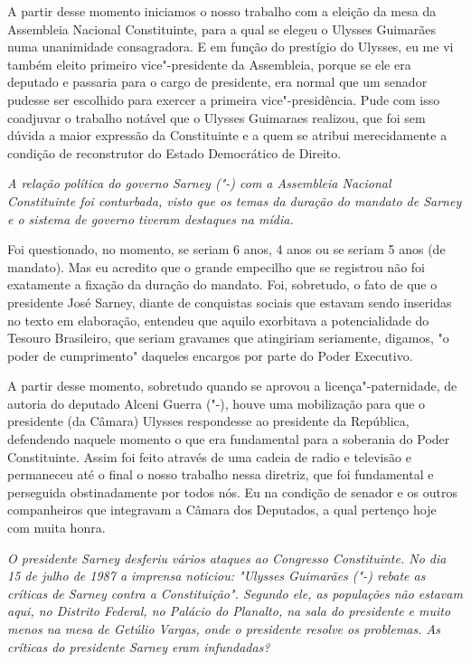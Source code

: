 A partir desse momento iniciamos o nosso trabalho com a eleição da mesa
da Assembleia Nacional Constituinte, para a qual se elegeu o Ulysses
Guimarães numa unanimidade consagradora. E em função do prestígio do
Ulysses, eu me vi também eleito primeiro vice"-presidente da Assembleia,
porque se ele era deputado e passaria para o cargo de presidente, era
normal que um senador pudesse ser escolhido para exercer a primeira
vice"-presidência. Pude com isso coadjuvar o trabalho notável que o
Ulysses Guimaraes realizou, que foi sem dúvida a maior expressão da
Constituinte e a quem se atribui merecidamente a condição de
reconstrutor do Estado Democrático de Direito.

\medskip

\emph{A relação política do governo Sarney ("-) com a Assembleia
Nacional Constituinte foi conturbada, visto que os temas da duração do
mandato de Sarney e o sistema de governo tiveram destaques na mídia.}

Foi questionado, no momento, se seriam 6 anos, 4
anos ou se seriam 5 anos (de mandato). Mas eu acredito que o grande
empecilho que se registrou não foi exatamente a fixação da duração do
mandato. Foi, sobretudo, o fato de que o presidente José Sarney, diante
de conquistas sociais que estavam sendo inseridas no texto em
elaboração, entendeu que aquilo exorbitava a potencialidade do Tesouro
Brasileiro, que seriam gravames que atingiriam seriamente, digamos, "o
poder de cumprimento" daqueles encargos por parte do Poder Executivo.

A partir desse momento, sobretudo quando se aprovou a
licença"-paternidade, de autoria do deputado Alceni Guerra ("-),
houve uma mobilização para que o presidente (da Câmara) Ulysses
respondesse ao presidente da República, defendendo naquele momento o que
era fundamental para a soberania do Poder Constituinte. Assim foi feito
através de uma cadeia de radio e televisão e permaneceu até o final o
nosso trabalho nessa diretriz, que foi fundamental e perseguida
obstinadamente por todos nós. Eu na condição de senador e os outros
companheiros que integravam a Câmara dos Deputados, a qual pertenço hoje
com muita honra.

\medskip

\emph{O presidente Sarney desferiu vários ataques ao Congresso
Constituinte. No dia 15 de julho de 1987 a imprensa noticiou: "Ulysses
Guimarães ("-) rebate as críticas de Sarney contra a Constituição".
Segundo ele, as populações não estavam aqui, no Distrito Federal, no
Palácio do Planalto, na sala do presidente e muito menos na mesa de
Getúlio Vargas, onde o presidente resolve os problemas. As críticas do
presidente Sarney eram infundadas?}

